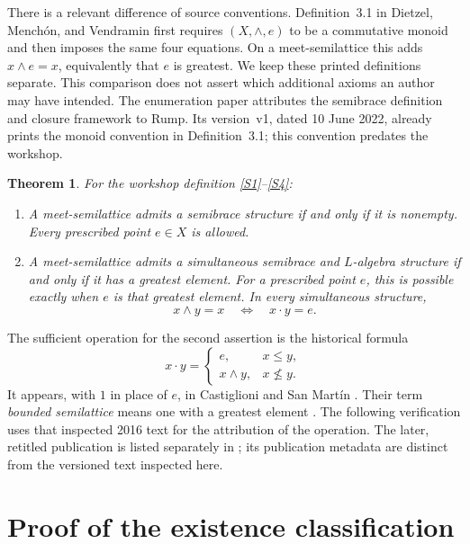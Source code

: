 \documentclass[11pt]{article}
\newtheorem{theorem}{Theorem}
\newcommand{\meet}{\wedge}
\newcommand{\dotop}{\mathbin{\cdot}}
\begin{document}
There is a relevant difference of source conventions. Definition~3.1 in
Dietzel, Mench\'on, and Vendramin \cite{Enumeration} first requires
\((X,\meet,e)\) to be a commutative monoid and then imposes the same four
equations. On a meet-semilattice this adds \(x\meet e=x\), equivalently that
\(e\) is greatest. We keep these printed definitions separate. This
comparison does not assert which additional axioms an author may have
intended.
The enumeration paper attributes the semibrace definition and closure
framework to Rump. Its version~v1, dated 10 June 2022, already prints the
monoid convention in Definition~3.1; this convention predates the workshop.

\begin{theorem}\label{main}
For the workshop definition \eqref{S1}--\eqref{S4}:
\begin{enumerate}
\item A meet-semilattice admits a semibrace structure if and only if it is
nonempty. Every prescribed point \(e\in X\) is allowed.
\item A meet-semilattice admits a simultaneous semibrace and \(L\)-algebra
structure if and only if it has a greatest element. For a prescribed point
\(e\), this is possible exactly when \(e\) is that greatest element. In
every simultaneous structure,
\[
x\meet y=x\quad\Longleftrightarrow\quad x\dotop y=e.
\]
\end{enumerate}
\end{theorem}

The sufficient operation for the second assertion is the historical formula
\begin{equation}\label{construction}
x\dotop y=
\begin{cases}
e,&x\leq y,\\
x\meet y,&x\not\leq y.
\end{cases}
\end{equation}
It appears, with \(1\) in place of \(e\), in Castiglioni and San Mart\'in
\cite[p.~7, Example~3.5(4)]{CastiglioniPreprint}. Their term
\emph{bounded semilattice} means one with a greatest element
\cite[p.~2]{CastiglioniPreprint}. The following verification uses that
inspected 2016 text for the attribution of the operation. The later,
retitled publication is listed separately in \cite{CastiglioniPublished};
its publication metadata are distinct from the versioned text inspected
here.

\section{Proof of the existence classification}
\end{document}
